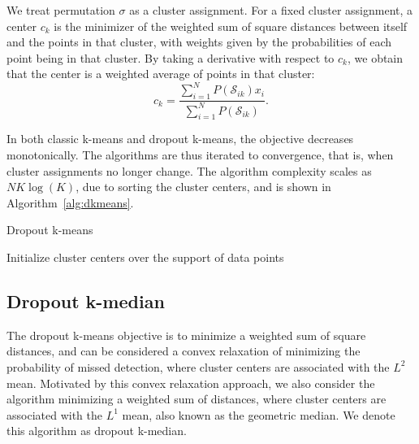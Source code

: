 \documentclass{article}
\begin{document}
We treat permutation $\sigma$ as a cluster assignment. For a fixed cluster assignment, a center $c_k$ is the minimizer of the weighted sum of square distances between itself and the points in that cluster, with weights given by the probabilities of each point being in that cluster. By taking a derivative with respect to $c_k$, we obtain that the center is a weighted average of points in that cluster:
\begin{equation}
c_k = \frac{\sum_{i=1}^N P(\mathcal{S}_{ik})x_i}{\sum_{i=1}^N P(\mathcal{S}_{ik})}.
\end{equation}

In both classic k-means and dropout k-means, the objective decreases monotonically. The algorithms are thus iterated to convergence, that is, when cluster assignments no longer change. The algorithm complexity scales as $NK\log(K)$, due to sorting the cluster centers, and is shown in Algorithm~\ref{alg:dkmeans}.

\begin{algorithm}
\caption{Dropout k-means}\label{alg:dkmeans}
 Initialize cluster centers over the support of data points
\end{algorithm}

\subsection{Dropout k-median}

The dropout k-means objective is to minimize a weighted sum of square distances, and can be considered a convex relaxation of minimizing the probability of missed detection, where cluster centers are associated with the $\mathit{L}^2$ mean. Motivated by this convex relaxation approach, we also consider the algorithm minimizing a weighted sum of distances, where cluster centers are associated with the $\mathit{L}^1$ mean, also known as the geometric median. We denote this algorithm as dropout k-median. 
\end{document}
